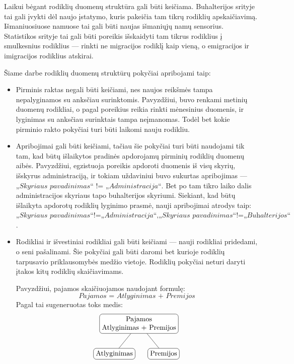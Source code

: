 \documentclass{VUMIFPSbakalaurinis}
\begin{document}
Laikui bėgant rodiklių duomenų struktūra gali būti keičiama. Buhalterijos srityje tai gali įvykti dėl naujo įstatymo, kuris pakeičia tam tikrų rodiklių apskaičiavimą. Išmaniuosiuose namuose tai gali būti naujas išmaniųjų namų sensorius. Statistikos srityje tai gali būti poreikis išskaidyti tam tikrus rodiklius į smulkesnius rodiklius — rinkti ne migracijos rodiklį kaip vieną, o emigracijos ir imigracijos rodiklius atskirai. \par
Šiame darbe rodiklių duomenų struktūrų pokyčiai apribojami taip:
\begin{itemize}
    \item Pirminis raktas negali būti keičiami, nes naujos reikšmės tampa nepalyginamos su anksčiau surinktomis. Pavyzdžiui, buvo renkami metinių duomenų rodikliai, o pagal poreikius reikia rinkti mėnesinius duomenis, ir lyginimas su anksčiau surinktais tampa neįmanomas. Todėl bet kokie pirminio rakto pokyčiai turi būti laikomi nauju rodikliu. 
    \item Apribojimai gali būti keičiami, tačiau šie pokyčiai turi būti naudojami tik tam, kad būtų išlaikytos pradinės apdorojamų pirminių rodiklių duomenų aibės. Pavyzdžiui, egzistuoja poreikis apdoroti duomenis iš visų skyrių, išskyrus administraciją, ir tokiam uždaviniui buvo sukurtas apribojimas — \(\textit{„Skyriaus pavadinimas“ != „Administracija“}\). Bet po tam tikro laiko dalis administracijos skyriaus tapo buhalterijos skyriumi. Siekiant, kad būtų išlaikyta apdorotų rodiklių lyginimo prasmė, nauji apribojimai atrodys taip: \(\textit{„Skyriaus pavadinimas“!=„Administracija“}, \textit{„Skyriaus pavadinimas“!=„Buhalterijos“}\).
    \item Rodikliai ir išvestiniai rodikliai gali būti keičiami — nauji rodikliai pridedami, o seni pašalinami. Šie pokyčiai gali būti daromi bet kurioje rodiklių tarpusavio priklausomybės medžio vietoje. Rodiklių pokyčiai neturi daryti įtakos kitų rodiklių skaičiavimams.
    \par Pavyzdžiui, pajamos skaičiuojamos naudojant formulę: \[\textit{Pajamos = Atlyginimas + Premijos}\] Pagal tai sugeneruotas toks medis: 
    \[	
        \begin{tikzpicture}[sibling distance=7em,	
            every node/.style = {shape=rectangle, rounded corners,	
                                 draw, align=center,	
                                 top color=white, bottom color=white}]	
            \node {Pajamos\\Atlyginimas + Premijos}	
                    child { node {Atlyginimas} }	
                    child { node {Premijos} } ;	

\end{tikzpicture}\]
\end{itemize}
\end{document}
